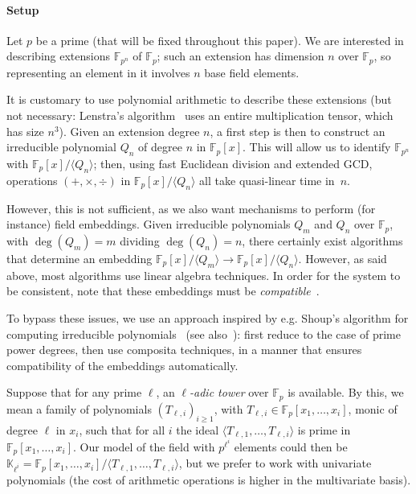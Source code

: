 \documentclass{sig-alternate}
\def\F {\ensuremath{\mathbb{F}}}
\def\K {\ensuremath{\mathbb{K}}}
\newcounter{algo}
\newcommand{\ang}[1]{\langle#1\rangle}
\begin{document}
\paragraph*{{\bf \rm Setup}}
Let $p$ be a prime (that will be fixed throughout this paper). We are
interested in describing extensions $\F_{p^n}$ of $\F_p$; such an
extension has dimension $n$ over $\F_p$, so representing an element in
it involves $n$ base field elements.

It is customary to use polynomial arithmetic to describe these
extensions (but not necessary: Lenstra's algorithm~\cite{LenstraJr91}
uses an entire multiplication tensor, which has size $n^3$). Given an
extension degree $n$, a first step is then to construct an irreducible
polynomial $Q_n$ of degree $n$ in $\F_p[x]$. This will allow us to
identify $\F_{p^n}$ with $\F_p[x]/\ang{Q_n}$; then, using fast
Euclidean division and extended GCD, operations $(+,\times,\div)$ in
$\F_p[x]/\ang{Q_n}$ all take quasi-linear time in~$n$.

However, this is not sufficient, as we also want mechanisms to perform
(for instance) field embeddings. Given irreducible polynomials $Q_m$
and $Q_n$ over $\F_p$, with $\deg(Q_m)=m$ dividing $\deg(Q_n)=n$,
there certainly exist algorithms that determine an embedding
$\F_p[x]/\ang{Q_m} \to \F_p[x]/\ang{Q_n}$. However, as said above,
most algorithms use linear algebra techniques. In order for the system
to be consistent, note that these embeddings must be {\em
  compatible}~\cite{bosma+cannon+steel97}.

To bypass these issues, we use an approach inspired by e.g. Shoup's
algorithm for computing irreducible polynomials~\cite{Shoup90,shoup94}
(see also~\cite{couveignes+lercier11,lenstra+desmit08-stdmodels}):
first reduce to the case of prime power degrees, then use composita
techniques, in a manner that ensures compatibility of the embeddings
automatically.

\smallskip{}
Suppose that for any prime $\ell$, an {\em $\ell$-adic tower} over
$\F_p$ is available. By this, we mean a family of polynomials
$(T_{\ell,i})_{i \ge 1}$, with $T_{\ell,i} \in \F_p[x_1,\dots,x_i]$,
monic of degree $\ell$ in $x_i$, such that for all $i$ the ideal
$\ang{T_{\ell,1},\dots,T_{\ell,i}}$ is prime in $\F_p[x_1,\dots,x_i]$.
Our model of the field with $p^{\ell^i}$ elements could then
be
$\K_{\ell^i}=\F_p[x_1,\dots,x_i]/\ang{T_{\ell,1},\dots,T_{\ell,i}}$,
but we prefer to work with univariate polynomials (the cost of
arithmetic operations is higher in the multivariate basis).  
\end{document}
